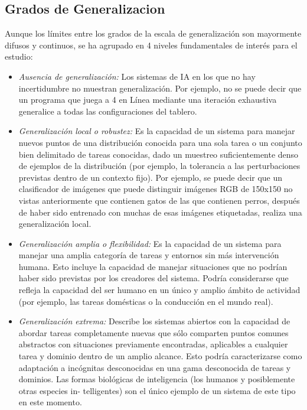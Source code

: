 \subsection{Grados de Generalizacion}

Aunque los límites entre los grados de la escala de generalización son mayormente difusos y continuos, se ha agrupado en 4 niveles fundamentales de interés para el estudio:

\begin{itemize}
\item \textit{Ausencia de generalización:} Los sistemas de IA en los que no hay incertidumbre no muestran generalización. Por ejemplo, no se puede decir que un programa que juega a 4 en Línea mediante una iteración exhaustiva generalice a todas las configuraciones del tablero.

\item \textit{Generalización local o robustez:} Es la capacidad de un sistema para manejar nuevos puntos de una distribución conocida para una sola tarea o un conjunto bien delimitado de tareas conocidas, dado un muestreo suficientemente denso de ejemplos de la distribución (por ejemplo, la tolerancia a las perturbaciones previstas dentro de un contexto fijo). Por ejemplo, se puede decir que un clasificador de imágenes que puede distinguir imágenes RGB de 150x150 no vistas anteriormente que contienen gatos de las que contienen perros, después de haber sido entrenado con muchas de esas imágenes etiquetadas, realiza una generalización local. 

\item \textit{Generalización amplia o flexibilidad:} Es la capacidad de un sistema para manejar una amplia categoría de tareas y entornos sin más intervención humana. Esto incluye la capacidad de manejar situaciones que no podrían haber sido previstas por los creadores del sistema. Podría considerarse que refleja la capacidad del ser humano en un único y amplio ámbito de actividad (por ejemplo, las tareas domésticas o la conducción en el mundo real).

\item \textit{Generalización extrema:} Describe los sistemas abiertos con la capacidad de abordar tareas completamente nuevas que sólo comparten puntos comunes abstractos con situaciones previamente encontradas, aplicables a cualquier tarea y dominio dentro de un amplio alcance. Esto podría caracterizarse como adaptación a incógnitas desconocidas en una gama desconocida de tareas y dominios. Las formas biológicas de inteligencia (los humanos y posiblemente otras especies in- telligentes) son el único ejemplo de un sistema de este tipo en este momento.
\end{itemize}

